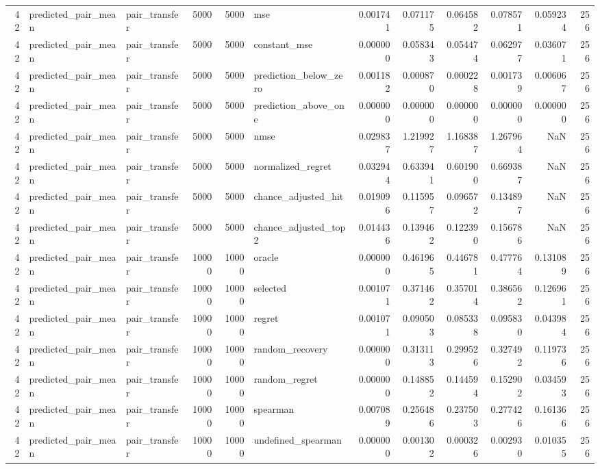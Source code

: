 \begin{tabular}{rllrrlrrrrrr}
42 & predicted_pair_mean & pair_transfer & 5000 & 5000 & mse & 0.001741 & 0.071175 & 0.064582 & 0.078571 & 0.059234 & 256 \\
42 & predicted_pair_mean & pair_transfer & 5000 & 5000 & constant_mse & 0.000000 & 0.058343 & 0.054474 & 0.062977 & 0.036071 & 256 \\
42 & predicted_pair_mean & pair_transfer & 5000 & 5000 & prediction_below_zero & 0.001182 & 0.000870 & 0.000228 & 0.001739 & 0.006067 & 256 \\
42 & predicted_pair_mean & pair_transfer & 5000 & 5000 & prediction_above_one & 0.000000 & 0.000000 & 0.000000 & 0.000000 & 0.000000 & 256 \\
42 & predicted_pair_mean & pair_transfer & 5000 & 5000 & nmse & 0.029837 & 1.219927 & 1.168387 & 1.267964 & NaN & 256 \\
42 & predicted_pair_mean & pair_transfer & 5000 & 5000 & normalized_regret & 0.032944 & 0.633941 & 0.601900 & 0.669387 & NaN & 256 \\
42 & predicted_pair_mean & pair_transfer & 5000 & 5000 & chance_adjusted_hit & 0.019096 & 0.115957 & 0.096572 & 0.134897 & NaN & 256 \\
42 & predicted_pair_mean & pair_transfer & 5000 & 5000 & chance_adjusted_top2 & 0.014436 & 0.139462 & 0.122390 & 0.156786 & NaN & 256 \\
42 & predicted_pair_mean & pair_transfer & 10000 & 10000 & oracle & 0.000000 & 0.461965 & 0.446781 & 0.477764 & 0.131089 & 256 \\
42 & predicted_pair_mean & pair_transfer & 10000 & 10000 & selected & 0.001071 & 0.371462 & 0.357014 & 0.386562 & 0.126961 & 256 \\
42 & predicted_pair_mean & pair_transfer & 10000 & 10000 & regret & 0.001071 & 0.090503 & 0.085338 & 0.095830 & 0.043984 & 256 \\
42 & predicted_pair_mean & pair_transfer & 10000 & 10000 & random_recovery & 0.000000 & 0.313113 & 0.299526 & 0.327492 & 0.119736 & 256 \\
42 & predicted_pair_mean & pair_transfer & 10000 & 10000 & random_regret & 0.000000 & 0.148852 & 0.144594 & 0.152902 & 0.034593 & 256 \\
42 & predicted_pair_mean & pair_transfer & 10000 & 10000 & spearman & 0.007089 & 0.256486 & 0.237503 & 0.277426 & 0.161366 & 256 \\
42 & predicted_pair_mean & pair_transfer & 10000 & 10000 & undefined_spearman & 0.000000 & 0.001302 & 0.000326 & 0.002930 & 0.010355 & 256 \\

\end{tabular}
